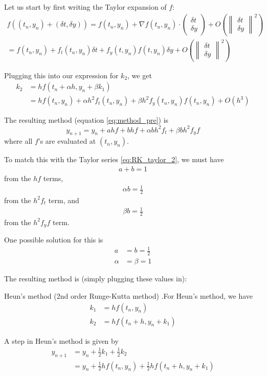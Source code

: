 \documentclass[12pt,letterpaper]{article}
\begin{document}
Let us start by first writing the Taylor expansion of $f$:
\begin{align}
f((t_n, y_n) + (\delta t, \delta y)) = f(t_n, y_n) + \nabla f(t_n, y_n) \cdot \begin{pmatrix}
	\delta t \\ \delta y
\end{pmatrix}
+ O\left(
\left\lVert
\begin{array}{c}
	\delta t \\ \delta y
\end{array}
\right\lVert^2
\right) \\
= f(t_n, y_n) + f_t(t_n, y_n) \delta t + f_y(t, y_n) f(t, y_n) \delta y
+ O\left(
\left\lVert
\begin{array}{c}
	\delta t \\ \delta y
\end{array}
\right\lVert^2
\right)
\end{align}

Plugging this into our expression for $k_2$, we get
\begin{align}
	k_2 &= h f(t_n + \alpha h, y_n + \beta k_1) \\
	&= hf(t_n, y_n) + \alpha h^2 f_t(t_n, y_n) + \beta h^2 f_y(t_n, y_n) f(t_n, y_n) + O(h^3)
\end{align}

The resulting method (equation \ref{eq:method_pre}) is
\begin{equation}
	y_{n+1} = y_n + ahf + bhf + \alpha b h^2 f_t + \beta b h^2 f_y f
\end{equation}
where all $f$'s are evaluated at $(t_n, y_n)$.

To match this with the Taylor series \ref{eq:RK_taylor_2}, we must have
\begin{align}
	a + b = 1
\end{align}
from the $hf$ terms,
\begin{align}
	\alpha b = \frac{1}{2}
\end{align}
from the $h^2 f_t$ term, and
\begin{align}
	\beta b = \frac{1}{2}
\end{align}
from the $h^2 f_y f$ term.

One possible solution for this is
\begin{align}
	a &= b = \frac{1}{2} \\
	\alpha &= \beta = 1
\end{align}

The resulting method is (simply plugging these values in):
\begin{algo}{Heun's method (2nd order Runge-Kutta method)}
.For Heun's method, we have
\begin{align}
	k_1 &= hf(t_n, y_n) \\
	k_2 &= hf(t_n+h, y_n+k_1)
\end{align}

A step in Heun's method is given by
\begin{align}
	y_{n+1} &= y_n + \frac{1}{2}k_1 + \frac{1}{2}k_2 \\
	&= y_n + \frac{1}{2}h f(t_n, y_n) + \frac{1}{2}h f(t_n+h, y_n+k_1)
\end{align}
\end{algo}
\end{document}
